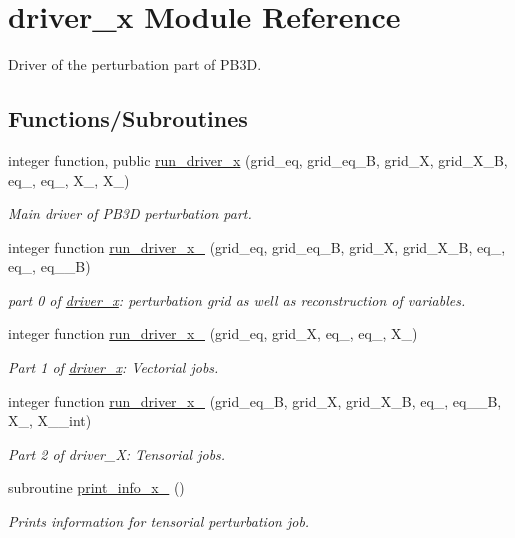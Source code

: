 \hypertarget{namespacedriver__x}{}\section{driver\+\_\+x Module Reference}
\label{namespacedriver__x}


Driver of the perturbation part of P\+B3D.  


\subsection*{Functions/\+Subroutines}
\begin{DoxyCompactItemize}
\item 
integer function, public \hyperlink{namespacedriver__x_ada3d72a0929daaa5e3da585246d62281}{run\+\_\+driver\+\_\+x} (grid\+\_\+eq, grid\+\_\+eq\+\_\+B, grid\+\_\+X, grid\+\_\+\+X\+\_\+B, eq\+\_, eq\+\_, X\+\_, X\+\_)
\begin{DoxyCompactList}\small\item\em Main driver of P\+B3D perturbation part. \end{DoxyCompactList}\item 
integer function \hyperlink{namespacedriver__x_a2b82a9bc6c0f4af9f3468d03fedc008e}{run\+\_\+driver\+\_\+x\+\_} (grid\+\_\+eq, grid\+\_\+eq\+\_\+B, grid\+\_\+X, grid\+\_\+\+X\+\_\+B, eq\+\_, eq\+\_, eq\+\_\+\_\+B)
\begin{DoxyCompactList}\small\item\em part 0 of \hyperlink{namespacedriver__x}{driver\+\_\+x}\+: perturbation grid as well as reconstruction of variables. \end{DoxyCompactList}\item 
integer function \hyperlink{namespacedriver__x_a454779cefa6da3714d32eedcec0ef7de}{run\+\_\+driver\+\_\+x\+\_} (grid\+\_\+eq, grid\+\_\+X, eq\+\_, eq\+\_, X\+\_)
\begin{DoxyCompactList}\small\item\em Part 1 of \hyperlink{namespacedriver__x}{driver\+\_\+x}\+: Vectorial jobs. \end{DoxyCompactList}\item 
integer function \hyperlink{namespacedriver__x_ad3924b3d66f336f0a9a9559eafffec8e}{run\+\_\+driver\+\_\+x\+\_} (grid\+\_\+eq\+\_\+B, grid\+\_\+X, grid\+\_\+\+X\+\_\+B, eq\+\_, eq\+\_\+\_\+B, X\+\_, X\+\_\+\_\+int)
\begin{DoxyCompactList}\small\item\em Part 2 of driver\+\_\+X\+: Tensorial jobs. \end{DoxyCompactList}\item 
subroutine \hyperlink{namespacedriver__x_aca49d362e21df044e21d5ba4b2599cf4}{print\+\_\+info\+\_\+x\+\_} ()
\begin{DoxyCompactList}\small\item\em Prints information for tensorial perturbation job. \end{DoxyCompactList}\end{DoxyCompactItemize}


